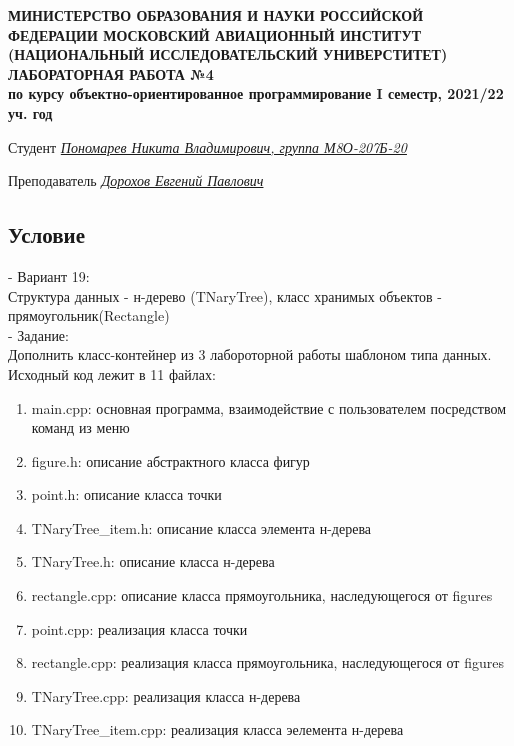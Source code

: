 \documentclass[12pt]{article}
\begin{document}
\begin{titlepage}
\begin{center}
\textbf{МИНИСТЕРСТВО ОБРАЗОВАНИЯ И НАУКИ РОССИЙСКОЙ ФЕДЕРАЦИИ
\medskip
МОСКОВСКИЙ АВИАЦИОННЫЙ ИНСТИТУТ
(НАЦИОНАЛЬНЫЙ ИССЛЕДОВАТЕЛЬСКИЙ УНИВЕРСТИТЕТ)
\vfill\vfill
{\Huge ЛАБОРАТОРНАЯ РАБОТА №4} \\
по курсу объектно-ориентированное программирование
I семестр, 2021/22 уч. год}
\end{center}
\vfill

Студент \uline{\it {Пономарев Никита Владимирович, группа М8О-207Б-20}\hfill}

Преподаватель \uline{\it {Дорохов Евгений Павлович}\hfill}

\vfill
\end{titlepage}

\subsection*{Условие}
 - Вариант 19:\\
Структура данных - н-дерево (TNaryTree), класс хранимых объектов - прямоугольник(Rectangle)\\
 - Задание: \\
Дополнить класс-контейнер из 3 лабороторной работы шаблоном типа данных.\\

Исходный код лежит в 11 файлах:
\begin{enumerate}
\item main.cpp: основная программа, взаимодействие с пользователем посредством команд из меню
\item figure.h:    описание абстрактного класса фигур
\item point.h:     описание класса точки
\item TNaryTree\_item.h:  описание класса элемента н-дерева
\item TNaryTree.h: описание класса н-дерева
\item rectangle.cpp: описание класса прямоугольника, наследующегося от figures
\item point.cpp:     реализация класса точки
\item rectangle.cpp: реализация класса прямоугольника, наследующегося от figures
\item TNaryTree.cpp:  реализация класса н-дерева
\item TNaryTree\_item.cpp:  реализация класса эелемента н-дерева

\end{enumerate}
\pagebreak
\end{document}

